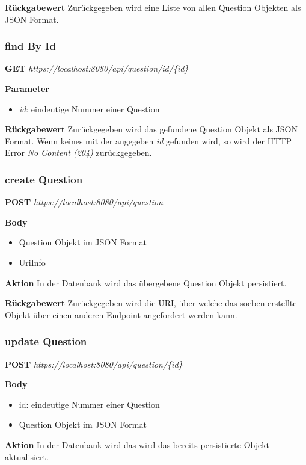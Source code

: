 \textbf{Rückgabewert}
Zurückgegeben wird eine Liste von allen Question Objekten als JSON
Format.

\subsubsection{find By Id}
\textbf{GET} \emph{https://localhost:8080/api/question/id/\{id\}}

\textbf{Parameter}
\begin{itemize}
    \item \emph{id}: eindeutige Nummer einer Question
\end{itemize}

\textbf{Rückgabewert}
Zurückgegeben wird das gefundene Question Objekt als JSON Format. Wenn keines mit der angegeben \emph{id} gefunden wird, so wird der
HTTP Error \emph{No Content (204)} zurückgegeben.

\subsubsection{create Question}
\textbf{POST} \emph{https://localhost:8080/api/question}

\textbf{Body}
\begin{itemize}
    \item Question Objekt im JSON Format
    \item UriInfo
\end{itemize}

\textbf{Aktion}
In der Datenbank wird das übergebene Question Objekt persistiert.

\textbf{Rückgabewert}
Zurückgegeben wird die URI, über welche das soeben erstellte Objekt über einen anderen Endpoint angefordert werden kann.

\subsubsection{update Question}
\textbf{POST} \emph{https://localhost:8080/api/question/\{id\}}

\textbf{Body}
\begin{itemize}
    \item id: eindeutige Nummer einer Question
    \item Question Objekt im JSON Format
\end{itemize}

\textbf{Aktion}
In der Datenbank wird das wird das bereits persistierte Objekt aktualisiert.

